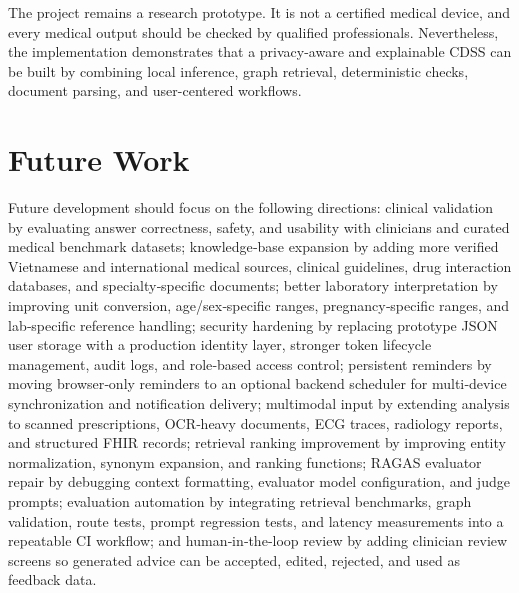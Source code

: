 \documentclass[../main.tex]{subfiles}
\begin{document}
The project remains a research prototype. It is not a certified medical device, and every medical output should be checked by qualified professionals. Nevertheless, the implementation demonstrates that a privacy-aware and explainable CDSS can be built by combining local inference, graph retrieval, deterministic checks, document parsing, and user-centered workflows.

\section{Future Work}
Future development should focus on the following directions: clinical validation by evaluating answer correctness, safety, and usability with clinicians and curated medical benchmark datasets; knowledge‑base expansion by adding more verified Vietnamese and international medical sources, clinical guidelines, drug interaction databases, and specialty‑specific documents; better laboratory interpretation by improving unit conversion, age/sex‑specific ranges, pregnancy‑specific ranges, and lab‑specific reference handling; security hardening by replacing prototype JSON user storage with a production identity layer, stronger token lifecycle management, audit logs, and role‑based access control; persistent reminders by moving browser‑only reminders to an optional backend scheduler for multi‑device synchronization and notification delivery; multimodal input by extending analysis to scanned prescriptions, OCR‑heavy documents, ECG traces, radiology reports, and structured FHIR records; retrieval ranking improvement by improving entity normalization, synonym expansion, and ranking functions; RAGAS evaluator repair by debugging context formatting, evaluator model configuration, and judge prompts; evaluation automation by integrating retrieval benchmarks, graph validation, route tests, prompt regression tests, and latency measurements into a repeatable CI workflow; and human‑in‑the‑loop review by adding clinician review screens so generated advice can be accepted, edited, rejected, and used as feedback data.
\end{document}
